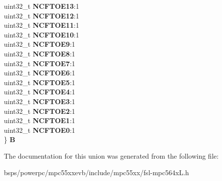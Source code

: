 \begin{DoxyCompactItemize}
\begin{tabbing}
\>uint32\_t {\bfseries NCFTOE13}:1\\
\>uint32\_t {\bfseries NCFTOE12}:1\\
\>uint32\_t {\bfseries NCFTOE11}:1\\
\>uint32\_t {\bfseries NCFTOE10}:1\\
\>uint32\_t {\bfseries NCFTOE9}:1\\
\>uint32\_t {\bfseries NCFTOE8}:1\\
\>uint32\_t {\bfseries NCFTOE7}:1\\
\>uint32\_t {\bfseries NCFTOE6}:1\\
\>uint32\_t {\bfseries NCFTOE5}:1\\
\>uint32\_t {\bfseries NCFTOE4}:1\\
\>uint32\_t {\bfseries NCFTOE3}:1\\
\>uint32\_t {\bfseries NCFTOE2}:1\\
\>uint32\_t {\bfseries NCFTOE1}:1\\
\>uint32\_t {\bfseries NCFTOE0}:1\\
\} {\bfseries B}\\

\end{tabbing}\end{DoxyCompactItemize}


The documentation for this union was generated from the following file\+:\begin{DoxyCompactItemize}
\item 
bsps/powerpc/mpc55xxevb/include/mpc55xx/fsl-\/mpc564x\+L.\+h\end{DoxyCompactItemize}

